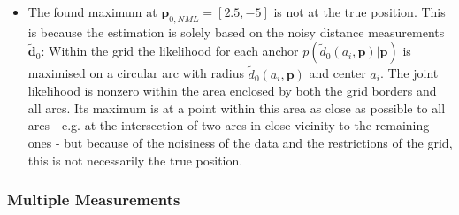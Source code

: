 \documentclass{article}
\begin{document}
\begin{itemize}
\item The found maximum at $\mathbf{p}_{0,NML} = \left[ 2.5, -5 \right]$ is not at the true position. This is because the estimation is solely based on the noisy distance measurements $\mathbf{\tilde{d}}_0$: Within the grid the likelihood for each anchor $p(\tilde{d}_0(a_i,\mathbf{p})|\mathbf{p})$ is maximised on a circular arc with radius $\tilde{d}_0(a_i,\mathbf{p})$  and center $a_i$. The joint likelihood is nonzero within the area enclosed by both the grid borders and all arcs. Its maximum is at a point within this area as close as possible to all arcs - e.g. at the intersection of two arcs in close vicinity to the remaining ones - but because of the noisiness of the data and the restrictions of the grid, this is not necessarily the true position.
\end{itemize}

\subsubsection{Multiple Measurements}
\end{document}
